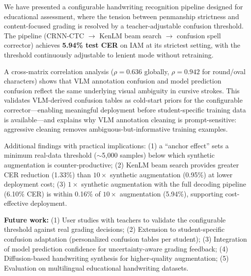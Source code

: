 \documentclass[conference]{IEEEtran}
\begin{document}
We have presented a configurable handwriting recognition pipeline designed for educational assessment, where the tension between penmanship strictness and content-focused grading is resolved by a teacher-adjustable confusion threshold. The pipeline (CRNN-CTC $\to$ KenLM beam search $\to$ confusion spell corrector) achieves \textbf{5.94\% test CER} on IAM at its strictest setting, with the threshold continuously adjustable to lenient mode without retraining.

A cross-matrix correlation analysis ($\rho=0.636$ globally, $\rho=0.942$ for round/oval characters) shows that VLM annotation confusion and model prediction confusion reflect the same underlying visual ambiguity in cursive strokes. This validates VLM-derived confusion tables as cold-start priors for the configurable corrector---enabling meaningful deployment before student-specific training data is available---and explains why VLM annotation cleaning is prompt-sensitive: aggressive cleaning removes ambiguous-but-informative training examples.

Additional findings with practical implications: (1) a ``anchor effect'' sets a minimum real-data threshold ($\sim$5,000 samples) below which synthetic augmentation is counter-productive; (2) KenLM beam search provides greater CER reduction (1.33\%) than $10\times$ synthetic augmentation (0.95\%) at lower deployment cost; (3) $1\times$ synthetic augmentation with the full decoding pipeline (6.10\% CER) is within 0.16\% of $10\times$ augmentation (5.94\%), supporting cost-effective deployment.

\textbf{Future work:} (1) User studies with teachers to validate the configurable threshold against real grading decisions; (2) Extension to student-specific confusion adaptation (personalized confusion tables per student); (3) Integration of model prediction confidence for uncertainty-aware grading feedback; (4) Diffusion-based handwriting synthesis for higher-quality augmentation; (5) Evaluation on multilingual educational handwriting datasets.
\end{document}
